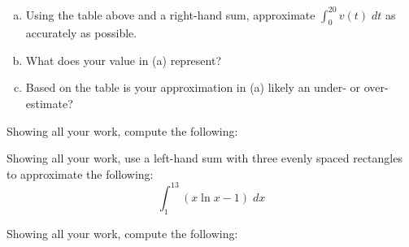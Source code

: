 \documentclass[12pt,letterpaper]{exam}
\begin{document}
\begin{questions}
\begin{enumerate}[(a)]
\item Using the table above and a right-hand sum, approximate $\displaystyle\int_0^{20} v(t) \;dt$ as accurately as possible. \vspace{4cm} \vfill
\item What does your value in (a) represent? \vfill
\item Based on the table is your approximation in (a) likely an under- or over-estimate? \vfill
\end{enumerate}



\newpage
\question Showing all your work, compute the following: \par\vspace{0.3cm}



\newpage
\question[10] Showing all your work, use a left-hand sum with three evenly spaced rectangles to approximate the following:
	\[
	\int_1^{13} \left( x \ln x - 1 \right) \;dx
	\]



\newpage
\question Showing all your work, compute the following: \par\vspace{0.3cm}




\end{questions}
\end{document}
